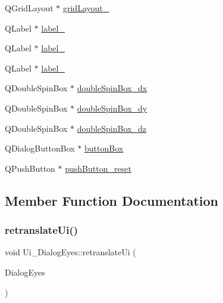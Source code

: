 \begin{DoxyCompactItemize}
\item 
Q\+Grid\+Layout $\ast$ \hyperlink{class_ui___dialog_eyes_aca6d083b4e7f08dde22c47e777a07779}{grid\+Layout\+\_}
\item 
Q\+Label $\ast$ \hyperlink{class_ui___dialog_eyes_ae8541d3c768ed2c09a8bbf8154c1d2f8}{label\+\_}
\item 
Q\+Label $\ast$ \hyperlink{class_ui___dialog_eyes_a70abfa97c9448788a4895316f88c0603}{label\+\_}
\item 
Q\+Label $\ast$ \hyperlink{class_ui___dialog_eyes_ac0330213bbebb84107c2970edb1f8eeb}{label\+\_}
\item 
Q\+Double\+Spin\+Box $\ast$ \hyperlink{class_ui___dialog_eyes_aababf5f01ccf0009e1131403900b1cae}{double\+Spin\+Box\+\_\+dx}
\item 
Q\+Double\+Spin\+Box $\ast$ \hyperlink{class_ui___dialog_eyes_a118542559787e7f13ed3e02ff70adb84}{double\+Spin\+Box\+\_\+dy}
\item 
Q\+Double\+Spin\+Box $\ast$ \hyperlink{class_ui___dialog_eyes_a82dfb342b687d0b2a377eb1f77c9682a}{double\+Spin\+Box\+\_\+dz}
\item 
Q\+Dialog\+Button\+Box $\ast$ \hyperlink{class_ui___dialog_eyes_ae39373bb3f9ab9b0ccc6dd2d999667c6}{button\+Box}
\item 
Q\+Push\+Button $\ast$ \hyperlink{class_ui___dialog_eyes_abf6a5d6aa5f67da211f2ff9a573ad4ac}{push\+Button\+\_\+reset}
\end{DoxyCompactItemize}


\subsection{Member Function Documentation}
\hypertarget{class_ui___dialog_eyes_ac241c0d82e58ce5044e0a76debc206b3}{}\label{class_ui___dialog_eyes_ac241c0d82e58ce5044e0a76debc206b3} 
\subsubsection{\texorpdfstring{retranslate\+Ui()}{retranslateUi()}}
{\footnotesize\ttfamily void Ui\+\_\+\+Dialog\+Eyes\+::retranslate\+Ui (\begin{DoxyParamCaption}\item[{Q\+Dialog $\ast$}]{Dialog\+Eyes }\end{DoxyParamCaption})\hspace{0.3cm}{\ttfamily [inline]}}

